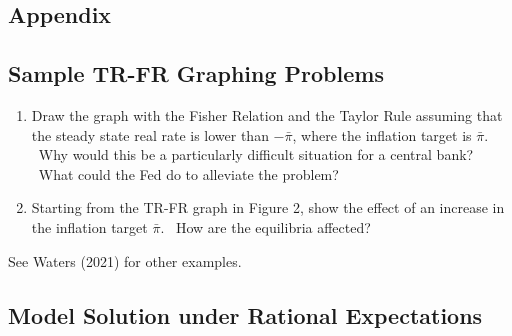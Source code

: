 \documentclass{article}
\begin{document}
\begin{doublespace}
\section{Appendix}

\subsection{\protect\Large Sample TR-FR Graphing Problems}

\begin{enumerate}
\item Draw the graph with the Fisher Relation and the Taylor Rule assuming
that the steady state real rate is lower than $-\bar{\pi}$, where the
inflation target is $\bar{\pi}$. \ Why would this be a particularly
difficult situation for a central bank? \ What could the Fed do to alleviate
the problem?

\item Starting from the TR-FR graph in Figure 2, show the effect of an
increase in the inflation target $\bar{\pi}$. \ How are the equilibria
affected?
\end{enumerate}

See Waters (2021) for other examples.

\subsection{Model Solution under Rational Expectations}


\end{doublespace}
\end{document}
